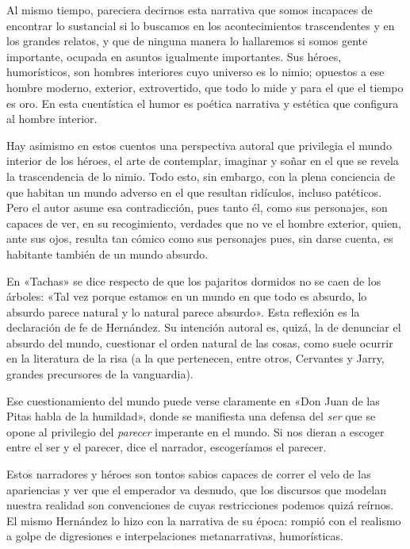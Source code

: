 \documentclass[14pt,twoside,final]{extbook} %
\begin{document}
Al mismo tiempo, pareciera decirnos esta narrativa que somos incapaces de encontrar lo sustancial si lo buscamos en los acontecimientos trascendentes y en los grandes relatos, y que de ninguna manera lo
hallaremos si somos gente importante, ocupada en asuntos igualmente importantes. Sus héroes, humorísticos, son hombres interiores cuyo universo es lo nimio; opuestos a ese hombre moderno, exterior, extrovertido, que todo lo mide y para el que el tiempo es oro. En esta cuentística el humor es poética narrativa y estética que configura al hombre interior.

Hay asimismo en estos cuentos una perspectiva autoral que privilegia el mundo interior de los héroes, el arte de contemplar, imaginar y soñar en el que se revela la trascendencia de lo nimio. Todo esto, sin embargo, con la plena conciencia de que habitan un mundo adverso en el que resultan ridículos, incluso patéticos. Pero el autor asume esa contradicción, pues tanto él, como sus personajes, son capaces de ver, en su recogimiento, verdades que no ve el hombre exterior, quien, ante sus ojos, resulta tan cómico como sus personajes pues, sin darse cuenta, es habitante también de un mundo absurdo.

En «Tachas» se dice respecto de que los pajaritos dormidos no se caen de los árboles: «Tal vez porque estamos en un mundo en que todo es absurdo, lo absurdo parece natural y lo natural parece absurdo». Esta reflexión es la declaración de fe de Hernández. Su intención autoral es, quizá, la de denunciar el absurdo del mundo, cuestionar el orden natural de las cosas, como suele ocurrir en la literatura de la risa (a la que pertenecen, entre otros, Cervantes y Jarry, grandes precursores de la vanguardia).

Ese cuestionamiento del mundo puede verse claramente en «Don Juan de las Pitas habla de la humildad», donde se manifiesta una defensa del \emph{ser} que se opone al privilegio del \emph{parecer} imperante en el mundo. Si nos dieran a escoger entre el ser y el parecer, dice el narrador, escogeríamos el parecer.

Estos narradores y héroes son tontos sabios capaces de correr el velo de las apariencias y ver que el emperador va desnudo, que los discursos que modelan nuestra realidad son convenciones de cuyas restricciones podemos quizá reírnos. El mismo Hernández lo hizo con la narrativa de su época: rompió con el realismo a golpe de digresiones e interpelaciones metanarrativas, humorísticas.
\end{document}
